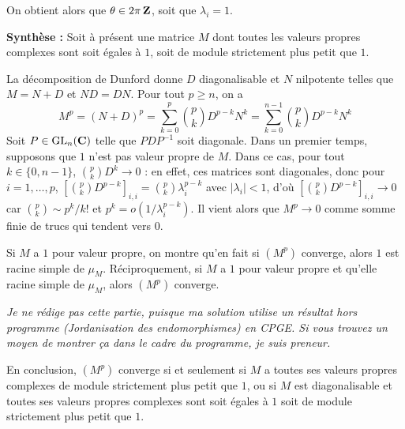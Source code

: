 \begin{correction}
\begin{itemize}
        On obtient alors que $\theta\in 2\pi\operatorname{\mathbf{Z}}$, soit que $\lambda_i=1$.
    \end{itemize}

    \textbf{Synthèse :} Soit à présent une matrice $M$ dont toutes les valeurs propres complexes sont soit égales à $1$,
    soit de module strictement plus petit que $1$.

    La décomposition de Dunford donne $D$ diagonalisable et $N$ nilpotente telles que $M=N+D$ et $ND=DN$.
    Pour tout $p\geq n$, on a 
    \[
        M^p=(N+D)^p=\sum_{k=0}^p\binom pkD^{p-k}N^k=\sum_{k=0}^{n-1}\binom pk D^{p-k}N^k   \tag*{(*)} 
    \]
    Soit $P\in\operatorname{\mathrm{GL}}_n(\operatorname{\mathbf{C}})$ telle que $PDP^{-1}$ soit diagonale. 
    Dans un premier temps, supposons que $1$ n'est pas valeur propre de $M$.
    Dans ce cas, pour tout $k\in\lbrace0,n-1\rbrace$, $\binom pkD^k\to 0$ : en effet,
    ces matrices sont diagonales, donc pour $i=1,\dots,p$, $[\binom pkD^{p-k}]_{i,i}=\binom pk\lambda_i^{p-k}$ avec 
    $|\lambda_i|<1$, d'où $[\binom pkD^{p-k}]_{i,i}\to 0$ car $\binom pk\sim p^k/k!$ et $p^k=o(1/\lambda_i^{p-k})$.
    Il vient alors que $M^p\to 0$ comme somme finie de trucs qui tendent vers $0$.

    Si $M$ a $1$ pour valeur propre, on montre qu'en fait si $(M^p)$ converge, alors $1$ est racine simple de $\mu_M$.
    Réciproquement, si $M$ a $1$ pour valeur propre et qu'elle racine simple de $\mu_M$, alors $(M^p)$ converge.
	
	\textit{Je ne rédige pas cette partie, puisque ma solution utilise un résultat hors programme (Jordanisation des endomorphismes) en CPGE. 
	Si vous trouvez un moyen de montrer ça dans le cadre du programme, je suis preneur.}
	



    En conclusion, $(M^p)$ converge si et seulement si $M$ a toutes ses valeurs propres complexes de module strictement plus petit que $1$,
    ou si $M$ est diagonalisable et toutes ses valeurs propres complexes sont soit égales à $1$ soit de module strictement plus petit que $1$.
\end{correction}

